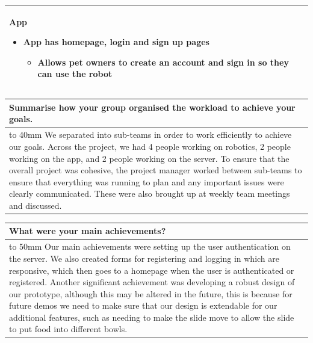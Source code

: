 \documentclass[a4paper]{article}
\newcommand{\colWidth}{141mm}
\begin{document}
\begin{center}
\begin{tabular}{|p{\colWidth}|}
{\begin{itemize}
\end{itemize}

App
\begin{itemize}
    \item App has homepage, login and sign up pages 
    \begin{itemize}
        \item Allows pet owners to create an account and sign in so they can use the robot
    \end{itemize}
\end{itemize}
  }
  \\
  \hline
\end{tabular}
\vskip 5mm


\begin{tabular}{|p{\colWidth}|}
	\hline
	\cellcolor{blue!25}\large
	\textbf{Summarise how your group organised the workload to achieve your goals.}
	\\ \hline
	\vtop to 40mm{
We separated into sub-teams in order to work efficiently to achieve our goals. Across the project, we had 4 people working on robotics, 2 people working on the app, and 2 people working on the server. To ensure that the overall project was cohesive, the project manager worked between sub-teams to ensure that everything was running to plan and any important issues were clearly communicated. These were also brought up at weekly team meetings and discussed.
  }
  \\
  \hline
\end{tabular}
\vskip 5mm


\begin{tabular}{|p{\colWidth}|}
	\hline
	\cellcolor{blue!25}\large
	\textbf{What were your main achievements?}
	\\ \hline
	\vtop to 50mm{
Our main achievements were setting up the user authentication on the server. We also created forms for registering and logging in which are responsive, which then goes to a homepage when the user is authenticated or registered. Another significant achievement was developing a robust design of our prototype, although this may be altered in the future, this is because for future demos we need to make sure that our design is extendable for our additional features, such as needing to make the slide move to allow the slide to put food into different bowls.
  }
  \\
  \hline
\end{tabular}
\vskip 5mm


\end{center}
\end{document}
